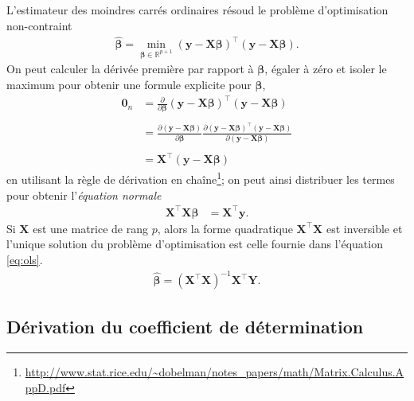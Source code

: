 \documentclass[
  11pt,
  letterpaper,
]{article}
\renewcommand{\href}[2]{#2\footnote{\url{#1}}}
\theoremstyle{definition}
\theoremstyle{definition}
\theoremstyle{definition}
\theoremstyle{definition}
\theoremstyle{remark}
\begin{document}
L'estimateur des moindres carrés ordinaires résoud le problème d'optimisation non-contraint
\begin{align*}
\widehat{\boldsymbol{\beta}}=\min_{\boldsymbol{\beta} \in \mathbb{R}^{p+1}}(\boldsymbol{y}-\mathbf{X}\boldsymbol{\beta})^\top(\boldsymbol{y}-\mathbf{X}\boldsymbol{\beta}).
\end{align*}
On peut calculer la dérivée première par rapport à \(\boldsymbol{\beta}\), égaler à zéro et isoler le maximum pour obtenir une formule explicite pour \(\widehat{\boldsymbol{\beta}}\),
\begin{align*}
\mathbf{0}_n&=\frac{\partial}{\partial\boldsymbol{\beta}}(\boldsymbol{y}-\mathbf{X}\boldsymbol{\beta})^\top(\boldsymbol{y}-\mathbf{X}\boldsymbol{\beta})\\
\\&=\frac{\partial (\boldsymbol{y}-\mathbf{X}\boldsymbol{\beta})}{\partial \boldsymbol{\beta}}\frac{\partial (\boldsymbol{y}-\mathbf{X}\boldsymbol{\beta})^\top(\boldsymbol{y}-\mathbf{X}\boldsymbol{\beta})}{\partial (\boldsymbol{y}-\mathbf{X}\boldsymbol{\beta})}\\
 \\&=\mathbf{X}^\top (\boldsymbol{y}-\mathbf{X}\boldsymbol{\beta})
\end{align*}
en utilisant la \href{http://www.stat.rice.edu/~dobelman/notes_papers/math/Matrix.Calculus.AppD.pdf}{règle de dérivation en chaîne}; on peut ainsi distribuer les termes pour obtenir l'\emph{équation normale}
\begin{align*}
 \mathbf{X}^\top \mathbf{X}\boldsymbol{\beta}&=\mathbf{X}^\top \boldsymbol{y}.
\end{align*}
Si \(\mathbf{X}\) est une matrice de rang \(p\), alors la forme quadratique \(\mathbf{X}^\top \mathbf{X}\) est inversible et l'unique solution du problème d'optimisation est celle fournie dans l'équation \eqref{eq:ols}.
\begin{align*}
\widehat{\boldsymbol{\beta}} = (\mathbf{X}^{\top} \mathbf{X})^{-1} \mathbf{X}^{\top} \boldsymbol{Y}.
\end{align*}

\hypertarget{derivationR2}{%
\subsection{Dérivation du coefficient de détermination}\label{derivationR2}}
\end{document}
